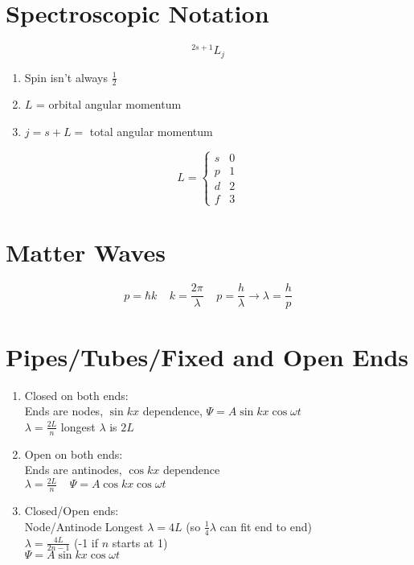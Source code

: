 \documentclass[10pt,letter]{article}
\begin{document}
\section{Spectroscopic Notation} %
\label{sec:spectroscopic_notation}
\begin{equation}
    ^{2s+1}L_j
\end{equation}
\begin{enumerate}
    \item Spin isn't always $\frac{1}{2}$    
    \item $L$ = orbital angular momentum
    \item $j= s+ L = $ total angular momentum
\end{enumerate}
\[
  L= \begin{cases}
    s & 0\\
    p & 1\\
    d & 2\\
    f & 3
  \end{cases}
\]

\section{Matter Waves} %
\label{sec:matter_waves}
\begin{equation}
    p = \hbar k ~~~~~ k = \frac{2 \pi }{\lambda} ~~~~~ p = \frac{h}{\lambda} \rightarrow \lambda = \frac{h}{p}
\end{equation}

\section{Pipes/Tubes/Fixed and Open Ends} %
\label{sec:pipes_tubes_fixed_and_open_ends}
\begin{enumerate}
    \item Closed on both ends:\\
    Ends are nodes, $\sin kx $ dependence, $\Psi = A \sin kx \cos \omega t$\\
    $\lambda = \frac{2L}{n}$  longest $\lambda$ is $2L$
    \item Open on both ends:\\
    Ends are antinodes, $\cos kx$ dependence\\
    $\lambda = \frac{2L}{n} ~~~~~ \Psi = A \cos kx \cos \omega t$
    \item Closed/Open ends:\\
    Node/Antinode   Longest $\lambda = 4L$ (so $\frac{1}{4}\lambda$ can fit end to end)\\
    $\lambda = \frac{4L}{2n-1}$ (-1 if $n$ starts at 1)\\
    $\Psi = A \sin kx \cos \omega t$
\end{enumerate}
\end{document}
